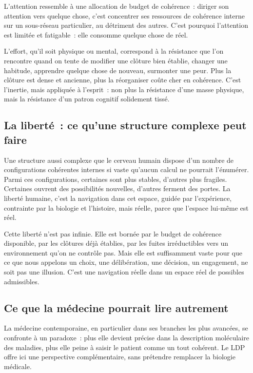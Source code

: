 \documentclass[12pt, a4paper, openright]{book}
\begin{document}
L'attention ressemble à une allocation de budget de cohérence~: diriger son attention vers quelque chose, c'est concentrer ses ressources de cohérence interne sur un sous-réseau particulier, au détriment des autres. C'est pourquoi l'attention est limitée et fatigable~: elle consomme quelque chose de réel.

\medskip

L'effort, qu'il soit physique ou mental, correspond à la résistance que l'on rencontre quand on tente de modifier une clôture bien établie, changer une habitude, apprendre quelque chose de nouveau, surmonter une peur. Plus la clôture est dense et ancienne, plus la réorganiser coûte cher en cohérence. C'est l'inertie, mais appliquée à l'esprit~: non plus la résistance d'une masse physique, mais la résistance d'un patron cognitif solidement tissé.

\subsection*{La liberté~: ce qu'une structure complexe peut faire}

Une structure aussi complexe que le cerveau humain dispose d'un nombre de configurations cohérentes internes si vaste qu'aucun calcul ne pourrait l'énumérer. Parmi ces configurations, certaines sont plus stables, d'autres plus fragiles. Certaines ouvrent des possibilités nouvelles, d'autres ferment des portes. La liberté humaine, c'est la navigation dans cet espace, guidée par l'expérience, contrainte par la biologie et l'histoire, mais réelle, parce que l'espace lui-même est réel.

\medskip

Cette liberté n'est pas infinie. Elle est bornée par le budget de cohérence disponible, par les clôtures déjà établies, par les fuites irréductibles vers un environnement qu'on ne contrôle pas. Mais elle est suffisamment vaste pour que ce que nous appelons un choix, une délibération, une décision, un engagement, ne soit pas une illusion. C'est une navigation réelle dans un espace réel de possibles admissibles.

\subsection*{Ce que la médecine pourrait lire autrement}

La médecine contemporaine, en particulier dans ses branches les plus avancées, se confronte à un paradoxe~: plus elle devient précise dans la description moléculaire des maladies, plus elle peine à saisir le patient comme un tout cohérent. Le LDP offre ici une perspective complémentaire, sans prétendre remplacer la biologie médicale.
\end{document}
